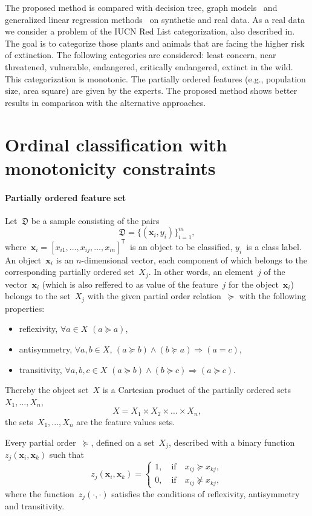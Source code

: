 \documentclass[12pt,preprint]{elsarticle}
\newcommand{\bx}{\mathbf{x}}
\newcommand{\T}{^{\mathsf{T}}}
\begin{document}
The proposed method is compared with decision tree, graph models~\cite{Wilhelm2021} and generalized linear regression methods~\cite{Eugene2023} on synthetic and real data. As a real data we consider a problem of the IUCN Red List categorization, also described in. The goal is to categorize those plants and animals that are facing the higher risk of extinction. The following categories are considered: least concern, near threatened, vulnerable, endangered, critically endangered, extinct in the wild. This categorization is monotonic. The partially ordered features (e.g., population size, area square) are given by the experts. The proposed method shows better results in comparison with the alternative approaches.

\section{Ordinal classification with monotonicity constraints}
\paragraph{Partially ordered feature set}
Let~$\mathfrak{D}$ be a sample consisting of the pairs
\[
\mathfrak{D}=\{(\bx_i,y_i)\}_{i=1}^m,
\label{eq:Sample}
\]
where~$\bx_i=[x_{i1},...,x_{ij},...,x_{in}]\T$~is an object to be classified, $y_i$~is a class label. An object~$\bx_i$ is an $n$-dimensional vector, each component of which belongs to the corresponding partially ordered set~$X_j$. In other words, an element~$j$ of the vector~$\bx_i$ (which is also reffered to as value of the feature~$j$ for the object~$\bx_i$) belongs to the set~$X_j$ with the given partial order relation~$\succeq$ with the following properties:
\begin{itemize}
\item reflexivity, $\forall a\in X$ $(a\succeq a)$,
\item antisymmetry, $\forall a,b\in X$, $(a\succeq b)\wedge(b\succeq a)\Rightarrow (a= c)$,
\item transitivity, $\forall a,b,c\in X$ $(a\succeq b)\wedge(b\succeq c)\Rightarrow (a\succeq c)$.
\end{itemize}
Thereby the object set~$X$ is a Cartesian product of the partially ordered sets~$X_1,...,X_n$,
\[
X=X_1\times X_2\times \dots \times X_n,
\]
the sets~$X_1,...,X_n$ are the feature values sets.

Every partial order~$\succeq$, defined on a set~$X_j$, described with a binary function~$z_j(\bx_i,\bx_k)$ such that
\[
z_j(\bx_i,\bx_k)=
\begin{cases}
1,\quad\text{if}\quad x_{ij} \succeq x_{kj}, \\
0,\quad\text{if}\quad x_{ij}\nsucceq x_{kj},
\end{cases}
\]
where the function~$z_j(\cdot,\cdot)$ satisfies the conditions of reflexivity, antisymmetry and transitivity.
\end{document}
